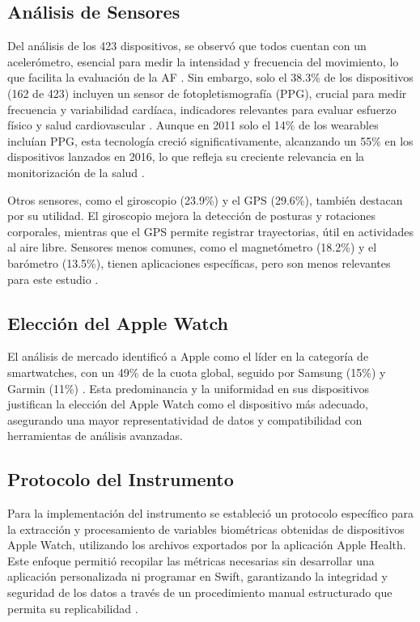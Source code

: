 \subsection{Análisis de Sensores}
\label{subsec:analisis_sensores}

Del análisis de los 423 dispositivos, se observó que todos cuentan con un acelerómetro, esencial para medir la intensidad y frecuencia del movimiento, lo que facilita la evaluación de la AF \citep{Henriksen2021ReplicationData}. Sin embargo, solo el 38.3\% de los dispositivos (162 de 423) incluyen un sensor de fotopletismografía (PPG), crucial para medir frecuencia y variabilidad cardíaca, indicadores relevantes para evaluar esfuerzo físico y salud cardiovascular \citep{Pinto2023Physiology}. Aunque en 2011 solo el 14\% de los wearables incluían PPG, esta tecnología creció significativamente, alcanzando un 55\% en los dispositivos lanzados en 2016, lo que refleja su creciente relevancia en la monitorización de la salud \citep{Henriksen2018}.

Otros sensores, como el giroscopio (23.9\%) y el GPS (29.6\%), también destacan por su utilidad. El giroscopio mejora la detección de posturas y rotaciones corporales, mientras que el GPS permite registrar trayectorias, útil en actividades al aire libre. Sensores menos comunes, como el magnetómetro (18.2\%) y el barómetro (13.5\%), tienen aplicaciones específicas, pero son menos relevantes para este estudio \citep{Henriksen2018}.

\subsection{Elección del Apple Watch}
\label{subsec:eleccion_apple_watch}

El análisis de mercado identificó a Apple como el líder en la categoría de smartwatches, con un 49\% de la cuota global, seguido por Samsung (15\%) y Garmin (11\%) \citep{Canalys2024Wearables}. Esta predominancia y la uniformidad en sus dispositivos justifican la elección del Apple Watch como el dispositivo más adecuado, asegurando una mayor representatividad de datos y compatibilidad con herramientas de análisis avanzadas.

\subsection{Protocolo del Instrumento}
\label{subsec:protocolo_instrumento}

Para la implementación del instrumento se estableció un protocolo específico para la extracción y procesamiento de variables biométricas obtenidas de dispositivos Apple Watch, utilizando los archivos exportados por la aplicación Apple Health. Este enfoque permitió recopilar las métricas necesarias sin desarrollar una aplicación personalizada ni programar en Swift, garantizando la integridad y seguridad de los datos a través de un procedimiento manual estructurado que permita su replicabilidad \citep{Apple2024HealthKit}.

